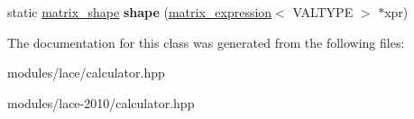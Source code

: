 \begin{DoxyCompactItemize}
\item 
\hypertarget{class__lace__expressions_1_1__summa__specific_3_01VALTYPE_00_01matrix__expression_3_01VALTYPE_01_4_01_4_a0d049beb3d828e2daf4c8aad3983f073}{static \hyperlink{struct__lace__storage_1_1matrix__shape}{matrix\-\_\-shape} {\bfseries shape} (\hyperlink{class__lace__expressions_1_1matrix__expression}{matrix\-\_\-expression}$<$ V\-A\-L\-T\-Y\-P\-E $>$ $\ast$xpr)}\label{class__lace__expressions_1_1__summa__specific_3_01VALTYPE_00_01matrix__expression_3_01VALTYPE_01_4_01_4_a0d049beb3d828e2daf4c8aad3983f073}

\end{DoxyCompactItemize}


The documentation for this class was generated from the following files\-:\begin{DoxyCompactItemize}
\item 
modules/lace/calculator.\-hpp\item 
modules/lace-\/2010/calculator.\-hpp\end{DoxyCompactItemize}
